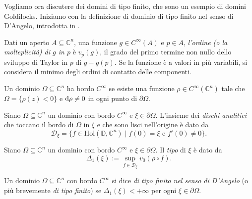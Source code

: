 Vogliamo ora discutere dei domini di tipo finito, che sono un esempio di domini Goldilocks. Iniziamo con la definizione di dominio di tipo finito nel senso di D'Angelo, introdotta in \cite{D'A}.

\begin{defn}
    Dati un aperto $A\subseteq\mathbb{C}^n$, una funzione $g\in C^\infty(A)$ e $p\in A$, \textit{l'ordine (o la molteplicità) di $g$ in $p$} è $v_p(g)$, il grado del primo termine non nullo dello sviluppo di Taylor in $p$ di $g-g(p)$. Se la funzione è a valori in più variabili, si considera il minimo degli ordini di contatto delle componenti.
\end{defn}

\begin{defn}
    Un dominio $\Omega\subseteq\mathbb{C}^n$ ha bordo $C^\infty$ se esiste una funzione $\rho\in C^\infty(\mathbb{C}^n)$ tale che $\Omega=\{\rho(z)<0\}$ e $\mathop{}\!\mathrm{d}\rho\not=0$ in ogni punto di $\partial\Omega$.
\end{defn}
    
\begin{defn} \label{discanal}
    Siano $\Omega\subseteq\mathbb{C}^n$ un dominio con bordo $C^\infty$ e $\xi\in\partial\Omega$. L'insieme dei \textit{dischi analitici} che toccano il bordo di $\Omega$ in $\xi$ e che sono lisci nell'origine è dato da
    $$\mathcal{D}_{\xi}=\{f\in\text{Hol}(\mathbb{D},\mathbb{C}^n)\mid f(0)=\xi\text{ e }f'(0)\not=0\}.$$
\end{defn}

\begin{defn}
    Siano $\Omega\subseteq\mathbb{C}^n$ un dominio con bordo $C^\infty$ e $\xi\in\partial\Omega$. Il \textit{tipo} di $\xi$ è dato da
    $$\Delta_1(\xi):=\sup_{f\in\mathcal{D}_{\xi}} v_0(\rho\circ f).$$
\end{defn}

\begin{defn}
    Un dominio $\Omega\subseteq\mathbb{C}^n$ con bordo $C^\infty$ si dice \textit{di tipo finito nel senso di D'Angelo} (o più brevemente \textit{di tipo finito}) se $\Delta_1(\xi)<+\infty$ per ogni $\xi\in\partial\Omega$.
\end{defn}

